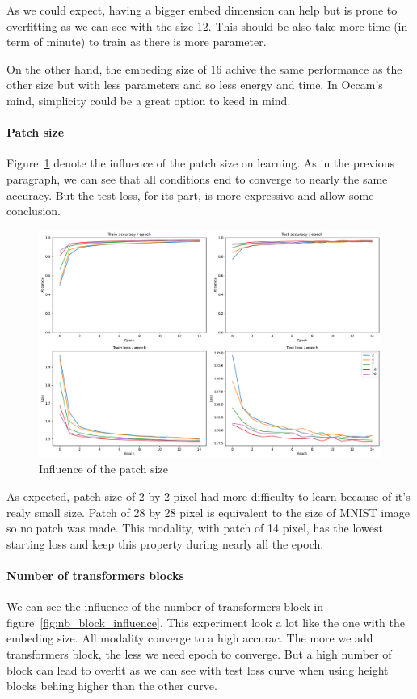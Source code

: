 \documentclass{article}
\theoremstyle{plain}%
\theoremstyle{definition}
\theoremstyle{remark}
\begin{document}
As we could expect, having a bigger embed dimension can help but is prone to overfitting as we can see with the size 12. This should be also take more time (in term of minute) to train as there is more parameter. 

On the other hand, the embeding size of 16 achive the same performance as the other size but with less parameters and so less energy and time. In Occam's mind, simplicity could be a great option to keed in mind.

\paragraph{Patch size}
Figure~\ref*{fig:patch_size_influence} denote the influence of the patch size on learning. As in the previous paragraph, we can see that all conditions end to converge to nearly the same accuracy. But the test loss, for its part, is more expressive and allow some conclusion.

\begin{figure}[H]
    \centering
    \includegraphics*[width=\textwidth]{figs/Transformers/patch_size_influence.pdf}
    \caption{Influence of the patch size}
    \label{fig:patch_size_influence}
\end{figure}

As expected, patch size of 2 by 2 pixel had more difficulty to learn because of it's realy small size. Patch of 28 by 28 pixel is equivalent to the size of MNIST image so no patch was made. This modality, with patch of 14 pixel, has the lowest starting loss and keep this property during nearly all the epoch. 

\paragraph{Number of transformers blocks}
We can see the influence of the number of transformers block in figure~\ref*{fig:nb_block_influence}. This experiment look a lot like the one with the embeding size. All modality converge to a high accurac. The more we add transformers block, the less we need epoch to converge. But a high number of block can lead to overfit as we can see with test loss curve when using height blocks behing higher than the other curve.
\end{document}
